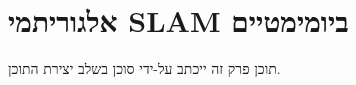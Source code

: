 \section{אלגוריתמי SLAM ביומימטיים}
\label{sec:slam}

תוכן פרק זה ייכתב על-ידי סוכן  בשלב יצירת התוכן.
